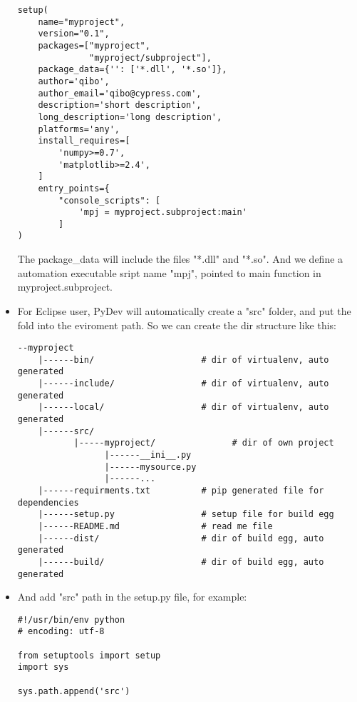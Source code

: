 \begin{itemize}
\begin{lstlisting}
setup(
    name="myproject",
    version="0.1",
    packages=["myproject", 
              "myproject/subproject"],
    package_data={'': ['*.dll', '*.so']},
    author='qibo',
    author_email='qibo@cypress.com',
    description='short description',
    long_description='long description',
    platforms='any',
    install_requires=[
        'numpy>=0.7',
        'matplotlib>=2.4',
    ]
    entry_points={
        "console_scripts": [
            'mpj = myproject.subproject:main'
        ]
)
\end{lstlisting}
The package\_data will include the files "*.dll" and "*.so". 
And we define a automation executable sript name "mpj", pointed to main function in myproject.subproject.
\item
For Eclipse user, PyDev will automatically create a "src" folder, and put the fold into the eviroment path. So we can create the dir structure like this:
\begin{lstlisting}
--myproject
    |------bin/                     # dir of virtualenv, auto generated
    |------include/                 # dir of virtualenv, auto generated
    |------local/                   # dir of virtualenv, auto generated
    |------src/
           |-----myproject/               # dir of own project 
                 |------__ini__.py
                 |------mysource.py
                 |------...
    |------requirments.txt          # pip generated file for dependencies
    |------setup.py                 # setup file for build egg
    |------README.md                # read me file
    |------dist/                    # dir of build egg, auto generated
    |------build/                   # dir of build egg, auto generated
\end{lstlisting}
\item
And add "src" path in the setup.py file, for example:
\begin{lstlisting}
#!/usr/bin/env python
# encoding: utf-8

from setuptools import setup
import sys

sys.path.append('src')


\end{lstlisting}
\end{itemize}
